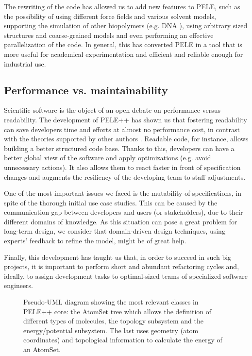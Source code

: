 The rewriting of the code has allowed us to add new features to PELE, such as the possibility of using different force fields and various solvent models, supporting the simulation of other biopolymers (e.g. DNA
\cite{cabeza_de_vaca_new_2015}), using arbitrary sized structures and coarse-grained models and
even performing an effective parallelization of the code. In general, this has converted PELE in a tool that is more useful for
academical experimentation and efficient and reliable enough for industrial use. 

\subsection{Performance vs. maintainability}

Scientific software is the object of an open debate on performance versus readability. The development of PELE++ has shown us
that fostering readability can save developers time and efforts at almost no performance cost, in contrast with the theories supported by other authors  \cite{larsson_algorithm_2011}. Readable code, for
instance, allows building a better structured code base. Thanks to this, developers can have a better global view of the
software and apply optimizations (e.g. avoid unnecessary actions). It also allows them to react faster in front of
specification changes and augments the resiliency of the developing team to staff adjustments. 

One of the most important issues we faced is the mutability of specifications, in spite of the thorough initial use case studies. This
can be caused by the communication gap between developers and users (or stakeholders), due to their different domains of
knowledge. As this situation can pose a great problem for long-term design, we consider that domain-driven design techniques,
using experts' feedback to refine the model, might be of great help. 

Finally, this development has taught us that,
in order to succeed in such big projects, it is important to perform short and abundant refactoring cycles and,
ideally, to assign development tasks to optimal-sized teams of specialized software engineers.

\begin{sidewaysfigure}
    \centering


\caption{Pseudo-UML diagram showing the most relevant classes in PELE++ core: the AtomSet tree which
allows the definition of different types of molecules, the topology subsystem and the energy/potential subsystem. The
last uses geometry (atom coordinates) and topological information to calculate the energy of an AtomSet.}

\label{fig:pele_core_uml}

\end{sidewaysfigure}

